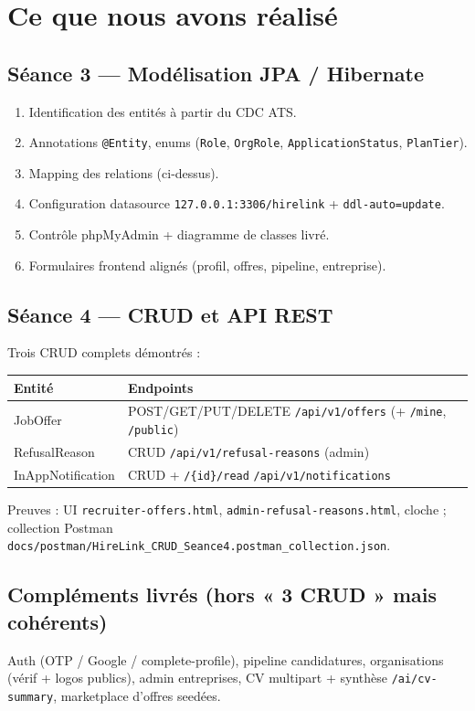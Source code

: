\documentclass[11pt,a4paper,oneside]{report}
\begin{document}
\chapter{Ce que nous avons réalisé}

\section{Séance 3 --- Modélisation JPA / Hibernate}
\begin{enumerate}[leftmargin=1.4em]
  \item Identification des entités à partir du CDC ATS.
  \item Annotations \texttt{@Entity}, enums (\texttt{Role}, \texttt{OrgRole}, \texttt{ApplicationStatus}, \texttt{PlanTier}).
  \item Mapping des relations (ci-dessus).
  \item Configuration datasource \texttt{127.0.0.1:3306/hirelink} + \texttt{ddl-auto=update}.
  \item Contrôle phpMyAdmin + diagramme de classes livré.
  \item Formulaires frontend alignés (profil, offres, pipeline, entreprise).
\end{enumerate}

\section{Séance 4 --- CRUD et API REST}
Trois CRUD complets démontrés :

\begin{tabularx}{\textwidth}{@{}lX@{}}
\toprule
\textbf{Entité} & \textbf{Endpoints} \\
\midrule
JobOffer & POST/GET/PUT/DELETE \texttt{/api/v1/offers} (+ \texttt{/mine}, \texttt{/public}) \\
RefusalReason & CRUD \texttt{/api/v1/refusal-reasons} (admin) \\
InAppNotification & CRUD + \texttt{/\{id\}/read} \texttt{/api/v1/notifications} \\
\bottomrule
\end{tabularx}

Preuves : UI \texttt{recruiter-offers.html}, \texttt{admin-refusal-reasons.html}, cloche ; collection Postman \texttt{docs/postman/HireLink\_CRUD\_Seance4.postman\_collection.json}.

\section{Compléments livrés (hors « 3 CRUD » mais cohérents)}
Auth (OTP / Google / complete-profile), pipeline candidatures, organisations (vérif + logos publics), admin entreprises, CV multipart + synthèse \texttt{/ai/cv-summary}, marketplace d'offres seedées.
\end{document}
